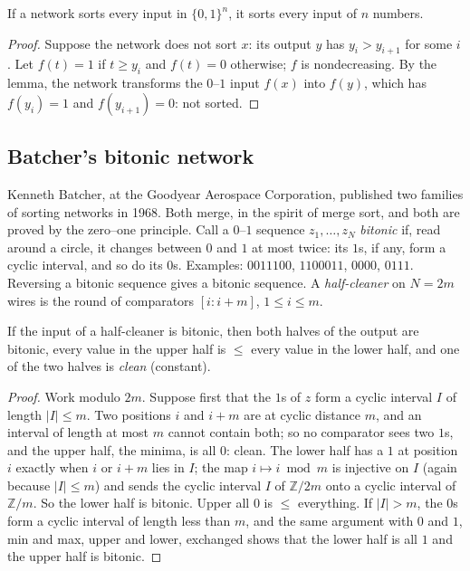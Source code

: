 \begin{theorem}\label{thm:zeroone}
If a network sorts every input in $\{0,1\}^n$, it sorts every input of $n$ numbers.
\end{theorem}
\begin{proof}
Suppose the network does not sort $x$: its output $y$ has $y_i>y_{i+1}$ for some $i$. Let $f(t)=1$ if $t\ge y_i$ and $f(t)=0$ otherwise; $f$ is nondecreasing. By the lemma, the network
transforms the $0$--$1$ input $f(x)$ into $f(y)$, which has $f(y_i)=1$ and $f(y_{i+1})=0$: not sorted.
\end{proof}

\subsection*{Batcher's bitonic network}

Kenneth Batcher, at the Goodyear Aerospace Corporation, published two families of sorting networks in 1968. Both merge, in the spirit of merge sort, and both are
proved by the zero--one principle. Call a $0$--$1$ sequence $z_1,\dots,z_N$ \emph{bitonic} if, read around a circle, it changes between $0$ and $1$ at most twice: its $1$s, if any, form a
cyclic interval, and so do its $0$s. Examples: $0011100$, $1100011$, $0000$, $0111$. Reversing a bitonic sequence gives a bitonic sequence. A \emph{half-cleaner} on $N=2m$ wires
is the round of comparators $[i:i+m]$, $1\le i\le m$.

\begin{lemma}\label{lem:halfclean}
If the input of a half-cleaner is bitonic, then both halves of the output are bitonic, every value in the upper half is $\le$ every value in the lower half, and one of the two
halves is \emph{clean} (constant).
\end{lemma}
\begin{proof}
Work modulo $2m$. Suppose first that the $1$s of $z$ form a cyclic interval $I$ of length $|I|\le m$. Two positions $i$ and $i+m$ are at cyclic distance $m$, and an interval of
length at most $m$ cannot contain both; so no comparator sees two $1$s, and the upper half, the minima, is all $0$: clean. The lower half has a $1$ at position $i$ exactly when $i$ or
$i+m$ lies in $I$; the map $i\mapsto i\bmod m$ is injective on $I$ (again because $|I|\le m$) and sends the cyclic interval $I$ of $\mathbb Z/2m$ onto a cyclic interval of $\mathbb Z/m$. So the lower
half is bitonic. Upper all $0$ is $\le$ everything. If $|I|>m$, the $0$s form a cyclic interval of length less than $m$, and the same argument with $0$ and $1$, min and max, upper
and lower, exchanged shows that the lower half is all $1$ and the upper half is bitonic.
\end{proof}

